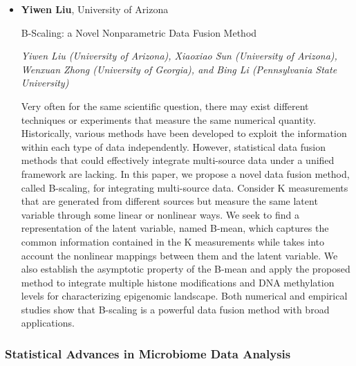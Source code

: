 \begin{itemize}
\item \textbf{Yiwen Liu}, University of Arizona

B-Scaling: a Novel Nonparametric Data Fusion Method

\emph{\footnotesize Yiwen Liu (University of Arizona), Xiaoxiao Sun (University of Arizona), Wenxuan Zhong (University of Georgia), and Bing Li (Pennsylvania State University)}

Very often for the same scientific question, there may exist different techniques or experiments that measure the same numerical quantity. Historically, various methods have been developed to exploit the information within each type of data independently. However, statistical data fusion methods that could effectively integrate multi-source data under a unified framework are lacking. In this paper, we propose a novel data fusion method, called B-scaling, for integrating multi-source data. Consider K measurements that are generated from different sources but measure the same latent variable through some linear or nonlinear ways. We seek to find a representation of the latent variable, named B-mean, which captures the common information contained in the K measurements while takes into account the nonlinear mappings between them and the latent variable. We also establish the asymptotic property of the B-mean and apply the proposed method to integrate multiple histone modifications and DNA methylation levels for characterizing epigenomic landscape. Both numerical and empirical studies show that B-scaling is a powerful data fusion method with broad applications.

\end{itemize}

\subsubsection*{Statistical Advances in Microbiome Data Analysis}

